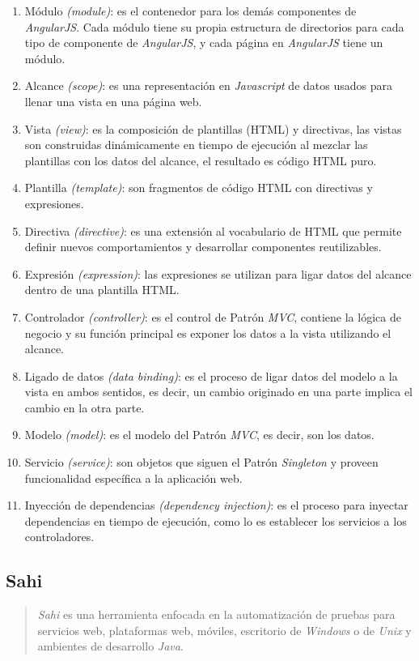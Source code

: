 \begin{enumerate}
	\item Módulo \textit{(module)}: es el contenedor para los demás componentes de \textit{AngularJS}. Cada módulo tiene su propia estructura de directorios para cada tipo de componente de \textit{AngularJS}, y cada página en \textit{AngularJS} tiene un módulo.
	\item Alcance \textit{(scope)}: es una representación en \textit{Javascript} de datos usados para llenar una vista en una página web.
	\item Vista \textit{(view)}: es la composición de plantillas (HTML) y directivas, las vistas son construidas dinámicamente en tiempo de ejecución al mezclar las plantillas con los datos del alcance, el resultado es código HTML puro.
	\item Plantilla \textit{(template)}: son fragmentos de código HTML con directivas y expresiones.
	\item Directiva \textit{(directive)}: es una extensión al vocabulario de HTML que permite definir nuevos comportamientos y desarrollar componentes reutilizables.
	\item Expresión \textit{(expression)}: las expresiones se utilizan para ligar datos del alcance dentro de una plantilla HTML.
	\item Controlador \textit{(controller)}: es el control de Patrón \textit{MVC}, contiene la lógica de negocio y su función principal es exponer los datos a la vista utilizando el alcance.
	\item Ligado de datos \textit{(data binding)}: es el proceso de ligar datos del modelo a la vista en ambos sentidos, es decir, un cambio originado en una parte implica el cambio en la otra parte.
	\item Modelo \textit{(model)}: es el modelo del Patrón \textit{MVC}, es decir, son los datos.
	\item Servicio \textit{(service)}: son objetos que siguen el Patrón \textit{Singleton} y proveen funcionalidad específica a la aplicación web.
	\item Inyección de dependencias \textit{(dependency injection)}: es el proceso para inyectar dependencias en tiempo de ejecución, como lo es establecer los servicios a los controladores.
\end{enumerate}

\subsection{Sahi}\label{sec:sahi}
\begin{quote}
	\textit{Sahi} es una herramienta enfocada en la automatización de pruebas para servicios web, plataformas web, móviles, escritorio de \textit{Windows}\textsuperscript{\textcopyright} o de \textit{Unix} y ambientes de desarrollo \textit{Java}\cite{SahiPro}.
\end{quote}

